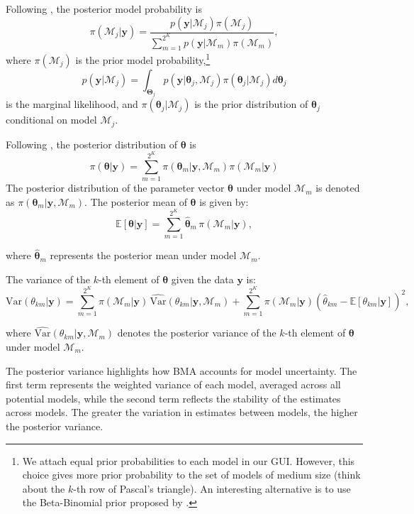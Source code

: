 Following \cite{Simmons2010}, the posterior model probability is
\begin{equation*}
	\pi(\mathcal{M}_j |\bm{y})=\frac{p(\bm{y} | \mathcal{M}_j)\pi(\mathcal{M}_j)}{\sum_{m=1}^{2^K}p(\bm{y} | \mathcal{M}_m)\pi(\mathcal{M}_m)},
\end{equation*}
where $\pi(\mathcal{M}_j)$ is the prior model probability,\footnote{We attach equal prior probabilities to each model in our GUI. However, this choice gives more prior probability to the set of models of medium size (think about the $k$-th row of Pascal's triangle). An interesting alternative is to use the Beta-Binomial prior proposed by \cite{ley2009effect}.} 
\begin{equation*}
	p(\bm{y} | \mathcal{M}_j)=\int_{\bm{\Theta}_j} p(\bm{y}| \bm{\theta}_j,\mathcal{M}_j)\pi(\bm{\theta}_j | \mathcal{M}_j) d\bm{\theta}_{j}
\end{equation*}
is the marginal likelihood, and $\pi(\bm{\theta}_j | \mathcal{M}_j)$ is the prior distribution of $\bm{\theta}_j$ conditional on model $\mathcal{M}_j$.

Following \cite{Raftery93}, the posterior distribution of $\bm{\theta}$ is 
\begin{equation*}
	\pi(\bm{\theta}|\bm{y})= \sum_{m=1}^{2^K}\pi(\bm{\theta}_m|\bm{y},\mathcal{M}_m) \pi(\mathcal{M}_m|\bm{y})
\end{equation*}
The posterior distribution of the parameter vector \(\bm{\theta}\) under model \(\mathcal{M}_m\) is denoted as \(\pi(\bm{\theta}_m|\bm{y}, \mathcal{M}_m)\). The posterior mean of \(\bm{\theta}\) is given by:
\[
\mathbb{E}[\bm{\theta}|\bm{y}] = \sum_{m=1}^{2^K} \hat{\bm{\theta}}_m \, \pi(\mathcal{M}_m|\bm{y}),
\]

where \(\hat{\bm{\theta}}_m\) represents the posterior mean under model \(\mathcal{M}_m\).

The variance of the \(k\)-th element of \(\bm{\theta}\) given the data \(\bm{y}\) is:
\[
\text{Var}(\theta_{km}|\bm{y}) = \sum_{m=1}^{2^K} \pi(\mathcal{M}_m|\bm{y}) \, \widehat{\text{Var}}(\theta_{km}|\bm{y}, \mathcal{M}_m) + \sum_{m=1}^{2^K} \pi(\mathcal{M}_m|\bm{y}) \left( \hat{\theta}_{km} - \mathbb{E}[\theta_{km}|\bm{y}] \right)^2,
\]

where \(\widehat{\text{Var}}(\theta_{km}|\bm{y}, \mathcal{M}_m)\) denotes the posterior variance of the \(k\)-th element of \(\bm{\theta}\) under model \(\mathcal{M}_m\).

The posterior variance highlights how BMA accounts for model uncertainty. The first term represents the weighted variance of each model, averaged across all potential models, while the second term reflects the stability of the estimates across models. The greater the variation in estimates between models, the higher the posterior variance.

